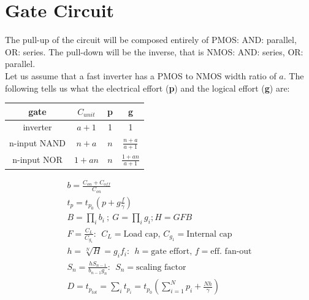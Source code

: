 \documentclass[twocolumn,8pt]{extarticle}
\begin{document}
\section*{Gate Circuit}
The pull-up of the circuit will be composed entirely of PMOS:
AND: parallel,
OR: series.
The pull-down will be the inverse, that is NMOS:
AND: series,
OR: parallel.\\
Let us assume that a fast inverter has a PMOS to NMOS width ratio of $a$. The following tells us what the electrical effort (\textbf{p}) and the logical effort (\textbf{g}) are:
\begin{center}
    \begin{tabular}{|c|c|c|c|}
        \hline
        gate         & $C_{unit}$ & p   & g                  \\
        \hline
        inverter     & $a+1$      & 1   & 1                  \\
        \hline
        n-input NAND & $n+a$      & $n$ & $\frac{n+a}{a+1}$  \\
        \hline
        n-input NOR  & $1+an$     & $n$ & $\frac{1+an}{a+1}$ \\
        \hline
    \end{tabular}
\end{center}
\begin{align*}
    b=\frac{C_{on}+C_{off}}{C_{on}}                                                               \\
    t_p = t_{p_0}\left(p+g\frac{f}{\gamma}\right)                                                 \\
    B = \prod_{i} b_i~;~G = \prod_{i} g_i; H = GFB                                                \\
    F = \frac{C_L}{C_{g_1}}:~~ C_L=\text{Load cap, } C_{g_1}=\text{Internal cap}                  \\
    h = \sqrt[N]{H}= g_i f_i :~~ h=\text{gate effort, }f=\text{eff. fan-out}                      \\
    S_n = \frac{hS_{n-1}}{b_{n-1}g_n}:~~ S_n=\text{scaling factor}                                \\
    D = t_{p_{tot}} = \sum_{i} t_{p_i} = t_{p_0}\left(\sum_{i=1}^{N}p_i+ \frac{Nh}{\gamma}\right) \\
\end{align*}
\end{document}
